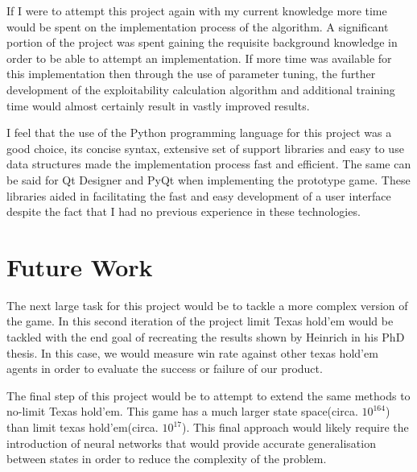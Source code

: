 If I were to attempt this project again with my current knowledge more time would be spent on the
implementation process of the algorithm.
A significant portion of the project was spent gaining the requisite background knowledge
in order to be able to attempt an implementation.
If more time was available for this implementation then through the use of parameter tuning,
the further development of the exploitability calculation algorithm and additional training
time would almost certainly result in vastly improved results.

I feel that the use of the Python programming language for this project was a good choice,
its concise syntax, extensive set of support libraries and easy to use data structures
made the implementation process fast and efficient.
The same can be said for Qt Designer and PyQt when implementing the prototype game.
These libraries aided in facilitating the fast and easy development of a user interface despite the fact
that I had no previous experience in these technologies.

\section{Future Work}\label{sec:futureWork}

The next large task for this project would be to tackle a more complex version of the game.
In this second iteration of the project limit Texas hold'em would be tackled with the end goal of recreating
the results shown by Heinrich in his PhD thesis\citep{heinrich2017reinforcement}.
In this case, we would measure win rate against other texas hold'em agents in order to evaluate
the success or failure of our product.

The final step of this project would be to attempt to extend the same methods to no-limit Texas hold'em.
This game has a much larger state space(circa. $10^{164}$) than limit texas hold'em(circa. $10^{17}$).
This final approach would likely require the introduction of neural networks that would provide accurate
generalisation between states in order to reduce the complexity of the problem.